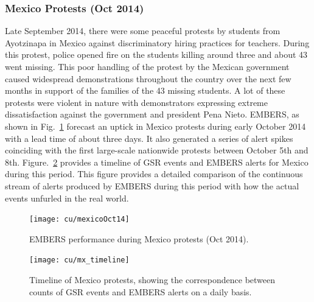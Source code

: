 \subsubsection*{Mexico Protests (Oct 2014)}
\label{sec:mexico}
Late September 2014, there were some peaceful protests by students from Ayotzinapa
in Mexico against discriminatory hiring practices for teachers. During this protest,
police opened fire on the students killing around three and about 43 went missing. This poor
handling of the protest by the Mexican government caused widespread demonstrations throughout
the country over the next few months in support of the families of the 43 missing students.
A lot of these protests were violent in nature with demonstrators expressing extreme
dissatisfaction against the government and president Pena Nieto. EMBERS, as shown in Fig.~\ref{fig:mexicoOct14} 
forecast an uptick in Mexico protests during early October 2014 with a lead time of about three days.
It also generated  a series of alert spikes coinciding with the first
large-scale nationwide protests between October 5th and 8th.
Figure.~\ref{fig:mexicoTimeline} provides a timeline of GSR events and
EMBERS alerts for Mexico during this period. This figure provides a detailed
comparison of the continuous stream of alerts produced by EMBERS during this period with how
the actual events unfurled in the real world.

\begin{figure}[H]
\centering
\texttt{[image: cu/mexicoOct14]}
\caption{EMBERS performance during Mexico protests (Oct 2014).}
\label{fig:mexicoOct14}
\end{figure}

\begin{figure}[H]
\centering
\texttt{[image: cu/mx\_timeline]}
\caption{Timeline of Mexico protests, showing the correspondence
between counts of GSR events and EMBERS alerts on a daily basis.}
\label{fig:mexicoTimeline}
\end{figure}

